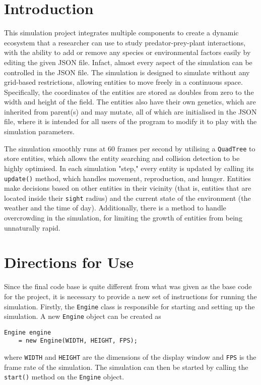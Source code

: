 \documentclass[10pt, a4paper]{scrartcl}
\begin{document}
    \begin{multicols}{2}


        \section{Introduction}
        \noindent This simulation project integrates multiple components to create a dynamic ecosystem that a researcher can use to
        study predator-prey-plant interactions, with the ability to add or remove any species or environmental factors easily
        by editing the given JSON file. Infact, almost every aspect of the simulation can be controlled in the JSON file.
        The simulation is designed to simulate without any grid-based restrictions, allowing entities to move freely in a
        continuous space. Specifically, the coordinates of the entities are stored as doubles from zero to the width and height
        of the field. The entities also have their own genetics, which are inherited from parent(s) and may mutate,
        all of which are initialised in the JSON file, where it is intended for all users of the program to modify it
        to play with the simulation parameters.

        \noindent The simulation smoothly runs at 60 frames per second by utilising a \verb|QuadTree| to store entities, which allows
        the entity searching and collision detection to be highly optimised. In each simulation "step," every entity is updated
        by calling its \verb|update()| method, which handles movement, reproduction, and hunger.
        Entities make decisions based on other entities in their vicinity (that is, entities that are located inside their
        \verb|sight| radius) and the current state of the environment (the weather and the time of day). Additionally, there is a
        method to handle overcrowding in the simulation, for limiting the growth of entities from being unnaturally rapid.

        \section{Directions for Use}

        Since the final code base is quite different from what was given as the base code for the project, it is necessary to 
        provide a new set of instructions for running the simulation. Firstly, the \verb|Engine| class is responsible for 
        starting and setting up the simulation. A new \verb|Engine| object can be created as
        \vspace{-0.1cm}
        \begin{verbatim}
Engine engine
    = new Engine(WIDTH, HEIGHT, FPS);
        \end{verbatim}
        \vspace{-0.7cm}
        where \verb|WIDTH| and \verb|HEIGHT| are the dimensions of the
        display window and \verb|FPS| is the frame rate of the simulation. The simulation can then be started by calling the
        \verb|start()| method on the \verb|Engine| object.


\end{multicols}
\end{document}
